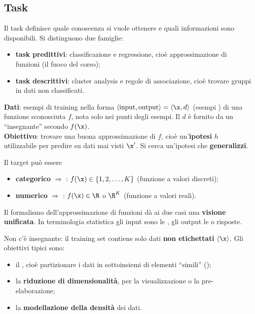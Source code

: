 \subsection{Task}
\label{sec:task}

Il task definisce quale conoscenza si vuole ottenere e quali informazioni sono disponibili. Si distinguono due
famiglie:
\begin{itemize}
  \item \textbf{task predittivi}: classificazione e regressione, cioè approssimazione di funzioni (il fuoco del
        corso);
  \item \textbf{task descrittivi}: cluster analysis e regole di associazione, cioè trovare gruppi in dati non
        classificati.
\end{itemize}

\begin{definizione}
\textbf{Dati}: esempi di training nella forma $\langle\text{input},\text{output}\rangle = \langle\x, d\rangle$
(esempi ) di una funzione sconosciuta $f$, nota solo nei punti degli esempi. Il
 $d$ è fornito da un ``insegnante'' secondo $f(\x)$.\\
\textbf{Obiettivo}: trovare una buona approssimazione di $f$, cioè un'\textbf{ipotesi} $h$ utilizzabile per
predire su dati mai visti $\x'$. Si cerca un'ipotesi che \textbf{generalizzi}.
\end{definizione}

Il target può essere
\begin{itemize}
  \item \textbf{categorico} $\Rightarrow$ : $f(\x)\in\{1,2,\dots,K\}$ (funzione a valori
        discreti);
  \item \textbf{numerico} $\Rightarrow$ : $f(\x)\in\R$ o $\R^K$ (funzione a valori reali).
\end{itemize}
Il formalismo dell'approssimazione di funzioni dà ai due casi una \textbf{visione unificata}. In terminologia
statistica gli input sono le , gli output le  o
risposte.

\begin{definizione}
Non c'è insegnante: il training set contiene solo dati \textbf{non etichettati} $\langle\x\rangle$. Gli
obiettivi tipici sono:
\begin{itemize}
  \item il , cioè partizionare i dati in sottoinsiemi di elementi ``simili''
        ();
  \item la \textbf{riduzione di dimensionalità}, per la visualizzazione o la pre-elaborazione;
  \item la \textbf{modellazione della densità} dei dati.
\end{itemize}
\end{definizione}

